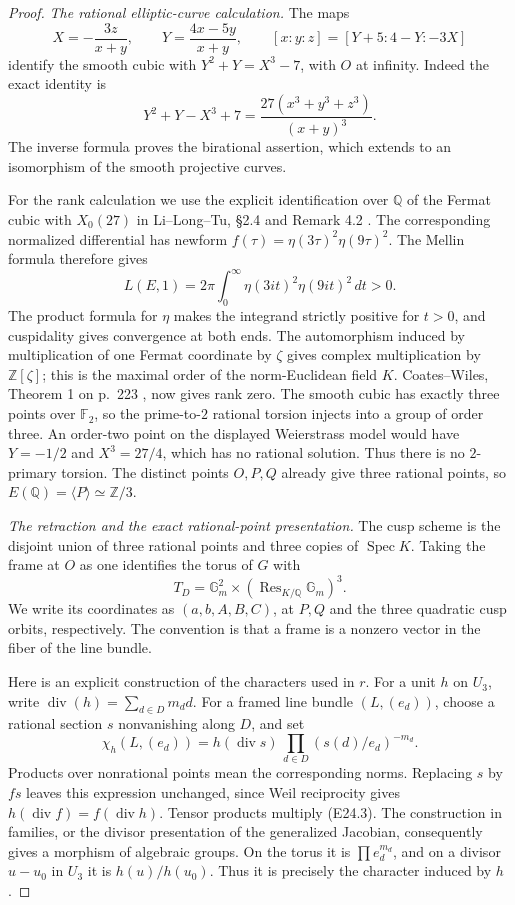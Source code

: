 \begin{proof}
\emph{The rational elliptic-curve calculation.}
The maps
\[
 X=-\frac{3z}{x+y},\qquad Y=\frac{4x-5y}{x+y},
 \qquad
 [x:y:z]=[Y+5:4-Y:-3X]
\]
identify the smooth cubic with $Y^2+Y=X^3-7$, with $O$ at infinity.
Indeed the exact identity is
\[
 Y^2+Y-X^3+7
 =\frac{27(x^3+y^3+z^3)}{(x+y)^3}.
\]
The inverse formula proves the birational assertion, which extends
to an isomorphism of the smooth projective curves.

For the rank calculation we use the explicit identification over
$\mathbb Q$ of the Fermat cubic with $X_0(27)$ in
Li--Long--Tu, \S2.4 and Remark 4.2
\cite{EC_LiLongTu}. The corresponding normalized differential has
newform
$f(\tau)=\eta(3\tau)^2\eta(9\tau)^2$.
The Mellin formula therefore gives
\[
 L(E,1)=2\pi\int_0^\infty
           \eta(3it)^2\eta(9it)^2\,dt>0 .
\]
The product formula for $\eta$ makes the integrand strictly
positive for $t>0$, and cuspidality gives convergence at both ends.
The automorphism induced by multiplication of one Fermat coordinate
by $\zeta$ gives complex multiplication by
$\mathbb Z[\zeta]$; this is the maximal order of the norm-Euclidean
field $K$. Coates--Wiles, Theorem 1 on p.~223
\cite{EC_CoatesWiles}, now gives rank zero.
The smooth cubic has exactly three points over $\mathbb F_2$,
so the prime-to-$2$ rational torsion injects into a group of order
three. An order-two point on the displayed Weierstrass model would
have $Y=-1/2$ and $X^3=27/4$, which has no rational solution.
Thus there is no $2$-primary torsion. The distinct points $O,P,Q$
already give three rational points, so $E(\mathbb Q)=\langle P\rangle
\simeq\mathbb Z/3$.

\emph{The retraction and the exact rational-point presentation.}
The cusp scheme is the disjoint union of three rational points and
three copies of $\operatorname{Spec}K$. Taking the frame at $O$ as
one identifies the torus of $G$ with
\[
 T_D=\mathbb G_m^2
       \times(\operatorname{Res}_{K/\mathbb Q}\mathbb G_m)^3.
\]
We write its coordinates as $(a,b,A,B,C)$, at $P,Q$ and the three
quadratic cusp orbits, respectively. The convention is that a frame
is a nonzero vector in the fiber of the line bundle.

Here is an explicit construction of the characters used in $r$.
For a unit $h$ on $U_3$, write
$\operatorname{div}(h)=\sum_{d\in D}m_d d$.
For a framed line bundle $(L,(e_d))$, choose a rational section
$s$ nonvanishing along $D$, and set
\[
 \chi_h(L,(e_d))
 =h(\operatorname{div}s)\,
        \prod_{d\in D}(s(d)/e_d)^{-m_d}.
 \tag{E24.3}
\]
Products over nonrational points mean the corresponding norms.
Replacing $s$ by $fs$ leaves this expression unchanged, since
Weil reciprocity gives
$h(\operatorname{div}f)=f(\operatorname{div}h)$.
Tensor products multiply (E24.3). The construction in families, or
the divisor presentation of the generalized Jacobian, consequently
gives a morphism of algebraic groups. On the torus it is
$\prod e_d^{m_d}$, and on a divisor $u-u_0$ in $U_3$ it is
$h(u)/h(u_0)$. Thus it is precisely the character induced by $h$.


\end{proof}
